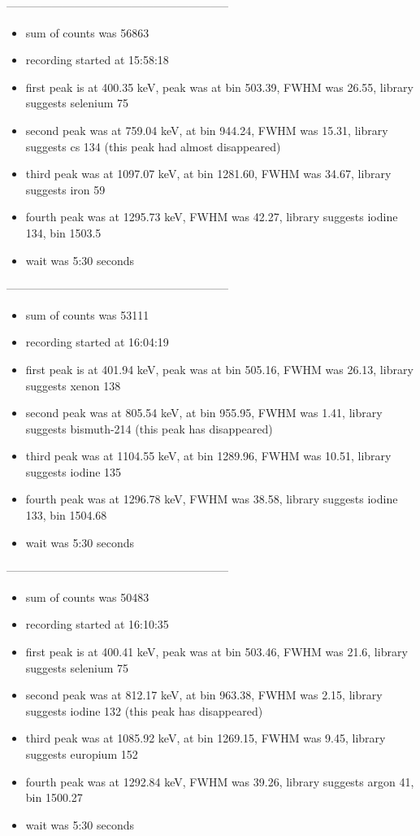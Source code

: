 \documentclass[a4paper]{article}
\begin{document}
-----------------------------------------------------------
\begin{itemize}
    \item sum of counts was 56863
    \item recording started at 15:58:18
    \item first peak is at 400.35 keV, peak was at bin 503.39, FWHM was 26.55, library suggests selenium 75
    \item second peak was at 759.04 keV, at bin 944.24, FWHM was 15.31, library suggests cs 134 (this peak had almost disappeared)
    \item third peak was at 1097.07 keV, at bin 1281.60, FWHM was 34.67, library suggests iron 59
    \item fourth peak was at 1295.73 keV, FWHM was 42.27, library suggests iodine 134, bin 1503.5
    \item wait was 5:30 seconds
\end{itemize}
-----------------------------------------------------------
\begin{itemize}
    \item sum of counts was 53111
    \item recording started at 16:04:19
    \item first peak is at 401.94 keV, peak was at bin 505.16, FWHM was 26.13, library suggests xenon 138
    \item second peak was at 805.54 keV, at bin 955.95, FWHM was 1.41, library suggests bismuth-214 (this peak has disappeared)
    \item third peak was at 1104.55 keV, at bin 1289.96, FWHM was 10.51, library suggests iodine 135
    \item fourth peak was at 1296.78 keV, FWHM was 38.58, library suggests iodine 133, bin 1504.68
    \item wait was 5:30 seconds
\end{itemize}
-----------------------------------------------------------
\begin{itemize}
    \item sum of counts was 50483
    \item recording started at 16:10:35
    \item first peak is at 400.41 keV, peak was at bin 503.46, FWHM was 21.6, library suggests selenium 75
    \item second peak was at 812.17 keV, at bin 963.38, FWHM was 2.15, library suggests iodine 132 (this peak has disappeared)
    \item third peak was at 1085.92 keV, at bin 1269.15, FWHM was 9.45, library suggests europium 152
    \item fourth peak was at 1292.84 keV, FWHM was 39.26, library suggests argon 41, bin 1500.27
    \item wait was 5:30 seconds
\end{itemize}
\end{document}
